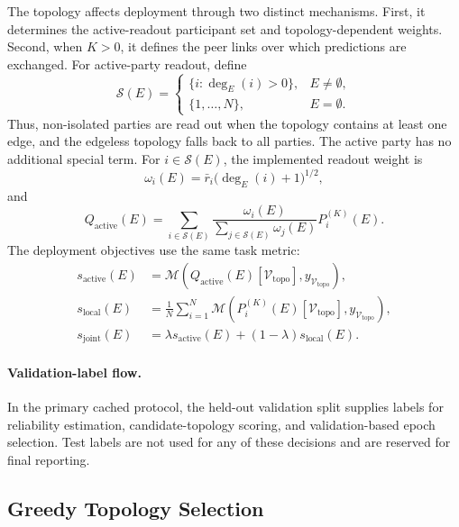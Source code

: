 \documentclass[letterpaper]{article}
\begin{document}
The topology affects deployment through two distinct mechanisms. First, it
determines the active-readout participant set and topology-dependent weights.
Second, when $K>0$, it defines the peer links over which predictions are
exchanged. For active-party readout, define
\begin{equation}
\mathcal{S}(E)=
\begin{cases}
\{i:\deg_E(i)>0\}, & E\neq\emptyset,\\
\{1,\ldots,N\}, & E=\emptyset.
\end{cases}
\end{equation}
Thus, non-isolated parties are read out when the topology contains at least one
edge, and the edgeless topology falls back to all parties. The active party has
no additional special term. For $i\in\mathcal{S}(E)$, the implemented readout
weight is
\begin{equation}
\omega_i(E)=
\bar r_i\bigl(\deg_E(i)+1\bigr)^{1/2},
\end{equation}
and
\begin{equation}
Q_{\mathrm{active}}(E)=
\sum_{i\in\mathcal{S}(E)}
\frac{\omega_i(E)}
{\sum_{j\in\mathcal{S}(E)}\omega_j(E)}
P_i^{(K)}(E).
\end{equation}
The deployment objectives use the same task metric:
\begin{align}
s_{\mathrm{active}}(E)&=\mathcal{M}\!\left(
Q_{\mathrm{active}}(E)[\mathcal{V}_{\mathrm{topo}}],
 y_{\mathcal{V}_{\mathrm{topo}}}\right),\nonumber\\
s_{\mathrm{local}}(E)&=\frac{1}{N}\sum_{i=1}^{N}
\mathcal{M}\!\left(P_i^{(K)}(E)[\mathcal{V}_{\mathrm{topo}}],
 y_{\mathcal{V}_{\mathrm{topo}}}\right),\nonumber\\
s_{\mathrm{joint}}(E)&=\lambda s_{\mathrm{active}}(E)
+(1-\lambda)s_{\mathrm{local}}(E).
\end{align}

\paragraph{Validation-label flow.}
In the primary cached protocol, the held-out validation split supplies labels
for reliability estimation, candidate-topology scoring, and validation-based
epoch selection. Test labels are not used for any of these decisions and are
reserved for final reporting.

\subsection{Greedy Topology Selection}
\end{document}
